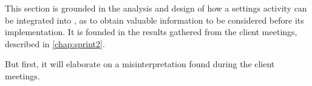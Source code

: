 This section is grounded in the analysis and design of how a settings activity can be integrated into \launcher, as to obtain valuable information to be considered before its implementation.
It is founded in the results gathered from the client meetings, described in \cref{chap:sprint2}.

But first, it will elaborate on a misinterpretation found during the client meetings.
